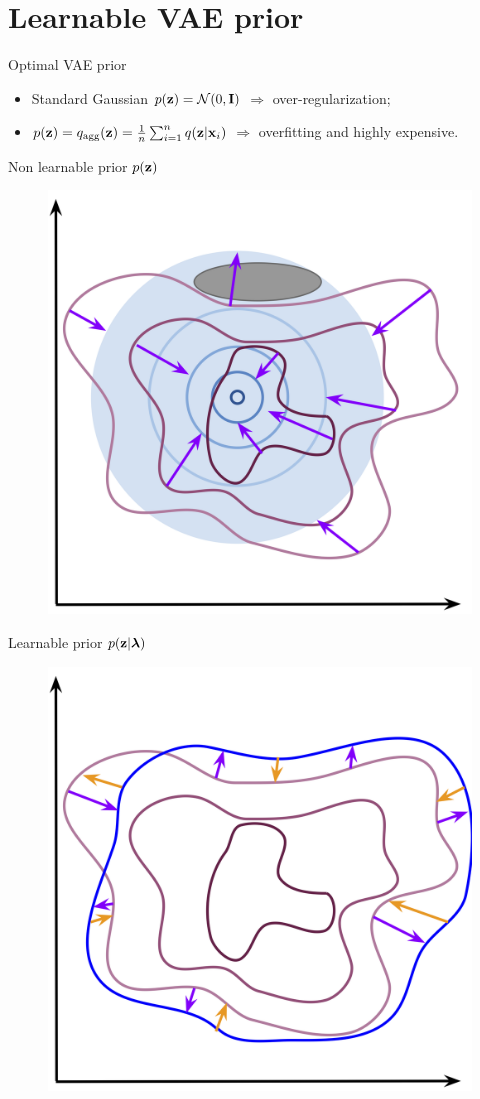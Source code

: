 \section{Learnable VAE prior}
\begin{frame}{Optimal VAE prior}
	\begin{itemize}
		\item Standard Gaussian $p(\mathbf{z}) = \mathcal{N}(0, \mathbf{I})$ $\Rightarrow$ over-regularization;
		\item $p(\mathbf{z}) = q_{\text{agg}}(\mathbf{z}) = \frac{1}{n}\sum_{i=1}^n q(\mathbf{z} | \mathbf{x}_i)$ $\Rightarrow$ overfitting and highly expensive.
	\end{itemize}
	\vspace{-0.5cm}
	\begin{minipage}[t]{0.5\columnwidth}
		\begin{block}{Non learnable prior $p(\mathbf{z})$}
			\begin{figure}[h]
				\centering
				\includegraphics[width=0.6\linewidth]{figs/non_learnable_prior}
			\end{figure}
		\end{block}
	\end{minipage}%
	\begin{minipage}[t]{0.5\columnwidth}
		\begin{block}{Learnable prior $p(\mathbf{z} | \boldsymbol{\lambda})$}
			\begin{figure}[h]
				\centering
				\includegraphics[width=0.6\linewidth]{figs/learnable_prior}

\end{figure}
\end{block}
\end{minipage}
\end{frame}

